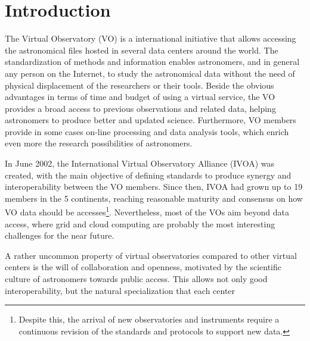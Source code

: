 \section{Introduction}
The Virtual Observatory (VO) \cite{Borne2013,HanischQuinn2003} is a
international initiative that allows accessing the astronomical files hosted in
several data centers around the world. The standardization of methods and information 
enables astronomers, and in general any person on the Internet, to study the 
astronomical data without the need of physical displacement of the researchers 
or their tools. Beside the obvious advantages in terms of time and budget of 
using a virtual service, the VO provides a broad access to previous observations
and related data, helping astronomers to produce better and updated
science. Furthermore, VO members provide in some cases on-line processing and
data analysis tools, which enrich even more the research possibilities of
astronomers. 

In June 2002, the International Virtual Observatory Alliance (IVOA)
\cite{website:ivoa-home} was created, with the main objective of
defining standards to produce synergy and interoperability between the
VO members. Since then, IVOA had grown up to 19 members in the 5 continents,
reaching reasonable maturity and consensus on how VO data should be
accesses\footnote{Despite this, the arrival of new observatories and instruments 
require a continuous revision of the standards and protocols to support new
data.}.
Nevertheless, most of the VOs aim beyond data access, where grid and cloud computing
are probably the most interesting challenges for the near future. 



A rather uncommon property of virtual observatories compared to other virtual 
centers is the will of collaboration and openness, motivated by the scientific
culture of astronomers towards public access. This allows not only good
interoperability, but the natural specialization that each center


